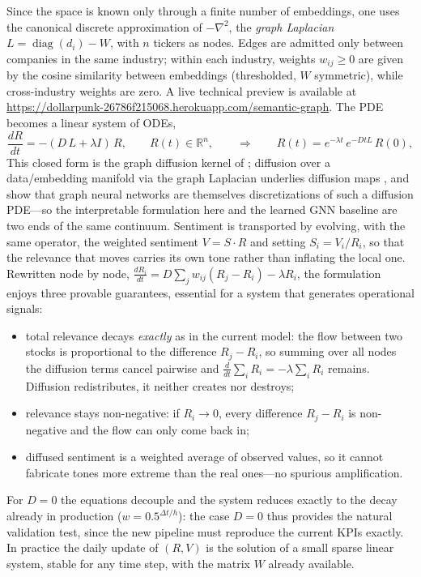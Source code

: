 \documentclass[a4paper,11pt]{article}
\begin{document}
Since the space is known only through a finite number of embeddings, one uses the canonical discrete approximation of $-\nabla^2$, the \emph{graph Laplacian} $L=\operatorname{diag}(d_i)-W$, with $n$ tickers as nodes. Edges are admitted only between companies in the same industry; within each industry, weights $w_{ij}\ge 0$ are given by the cosine similarity between embeddings (thresholded, $W$ symmetric), while cross-industry weights are zero. A live technical preview is available at \url{https://dollarpunk-26786f215068.herokuapp.com/semantic-graph}. The PDE becomes a linear system of ODEs,
\[
\frac{dR}{dt} = -(D\,L + \lambda I)\,R, \qquad R(t)\in\mathbb{R}^n,
\qquad\Longrightarrow\qquad
R(t)=e^{-\lambda t}\,e^{-D t L}\,R(0),
\]
This closed form is the graph diffusion kernel of \textcite{kondor2002diffusion}; diffusion over a data/embedding manifold via the graph Laplacian underlies diffusion maps \parencite{coifman2006diffusion}, and \textcite{chamberlain2021grand} show that graph neural networks are themselves discretizations of such a diffusion PDE---so the interpretable formulation here and the learned GNN baseline are two ends of the same continuum. Sentiment is transported by evolving, with the same operator, the weighted sentiment $V=S\cdot R$ and setting $S_i=V_i/R_i$, so that the relevance that moves carries its own tone rather than inflating the local one. Rewritten node by node, $\frac{dR_i}{dt}=D\sum_j w_{ij}(R_j-R_i)-\lambda R_i$, the formulation enjoys three provable guarantees, essential for a system that generates operational signals:
\begin{itemize}\setlength\itemsep{0.1em}
  \item total relevance decays \emph{exactly} as in the current model: the flow between two stocks is proportional to the difference $R_j-R_i$, so summing over all nodes the diffusion terms cancel pairwise and $\frac{d}{dt}\sum_i R_i=-\lambda\sum_i R_i$ remains. Diffusion redistributes, it neither creates nor destroys;
  \item relevance stays non-negative: if $R_i\to 0$, every difference $R_j-R_i$ is non-negative and the flow can only come back in;
  \item diffused sentiment is a weighted average of observed values, so it cannot fabricate tones more extreme than the real ones---no spurious amplification.
\end{itemize}
For $D=0$ the equations decouple and the system reduces exactly to the decay already in production ($w=0.5^{\Delta t/h}$): the case $D=0$ thus provides the natural validation test, since the new pipeline must reproduce the current KPIs exactly. In practice the daily update of $(R,V)$ is the solution of a small sparse linear system, stable for any time step, with the matrix $W$ already available.
\end{document}
